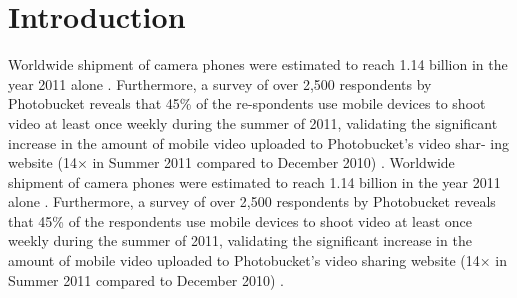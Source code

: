 \documentclass{new}
\begin{document}
\section{Introduction}
%
%
Worldwide shipment of camera phones were estimated to reach
1.14 billion in the year 2011 alone \cite{1}. Furthermore, a survey of
over 2,500 respondents by Photobucket reveals that 45\% of the re-spondents use mobile devices to shoot video at least once weekly
during the summer of 2011, validating the significant increase in
the amount of mobile video uploaded to Photobucket’s video shar-
ing website (14× in Summer 2011 compared to December 2010) \cite{2}.
Worldwide shipment of camera phones were estimated to reach 1.14 billion in the year 2011 alone \cite{1}. Furthermore, a survey of over 2,500 respondents by Photobucket reveals that 45\% of the respondents use mobile devices to shoot video at least once weekly during the summer of 2011, validating the significant increase in the amount of mobile video uploaded to Photobucket’s video sharing website (14× in Summer 2011 compared to December 2010) \cite{2}. 
\end{document}
